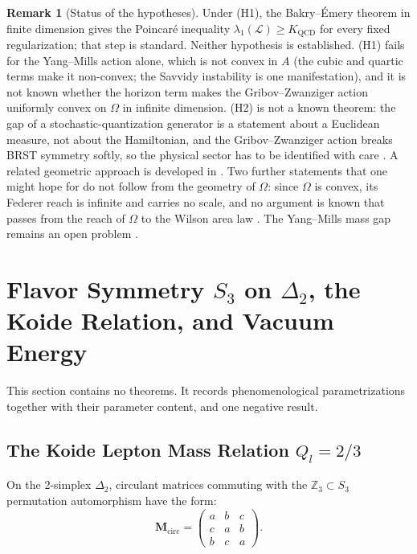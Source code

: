 \documentclass[11pt,a4paper,reqno]{amsart}
\theoremstyle{definition}
\newtheorem{remark}[theorem]{Remark}
\numberwithin{equation}{section}
\begin{document}
\begin{remark}[Status of the hypotheses]
\label{rem:ym_status}
Under (H1), the Bakry--\'Emery theorem in finite dimension gives the Poincar\'e inequality $\lambda_1(\mathcal{L}) \ge K_{\mathrm{QCD}}$ for every fixed regularization; that step is standard. Neither hypothesis is established. (H1) fails for the Yang--Mills action alone, which is not convex in $A$ (the cubic and quartic terms make it non-convex; the Savvidy instability \cite{savvidy1977infrared} is one manifestation), and it is not known whether the horizon term makes the Gribov--Zwanziger action uniformly convex on $\Omega$ in infinite dimension. (H2) is not a known theorem: the gap of a stochastic-quantization generator is a statement about a Euclidean measure, not about the Hamiltonian, and the Gribov--Zwanziger action breaks BRST symmetry softly, so the physical sector has to be identified with care \cite{vandersickel2012gribov}. A related geometric approach is developed in \cite{silvafilho2026yangmills}. Two further statements that one might hope for do not follow from the geometry of $\Omega$: since $\Omega$ is convex, its Federer reach \cite{federer1959curvature} is infinite and carries no scale, and no argument is known that passes from the reach of $\Omega$ to the Wilson area law \cite{wilson1974confinement}. The Yang--Mills mass gap remains an open problem \cite{jaffe2006quantum}.
\end{remark}

\section{Flavor Symmetry \texorpdfstring{$S_3$}{S3} on \texorpdfstring{$\Delta_2$}{Delta2}, the Koide Relation, and Vacuum Energy}
\label{sec:flavor_koide_vacuum}

This section contains no theorems. It records phenomenological parametrizations together with their parameter content, and one negative result.

\subsection{The Koide Lepton Mass Relation \texorpdfstring{$Q_l = 2/3$}{Ql = 2/3}}
On the 2-simplex $\Delta_2$, circulant matrices commuting with the $\mathbb{Z}_3 \subset S_3$ permutation automorphism have the form:
\begin{equation}
    \mathbf{M}_{\mathrm{circ}} = \begin{pmatrix} a & b & c \\ c & a & b \\ b & c & a \end{pmatrix}.
\end{equation}
\end{document}
